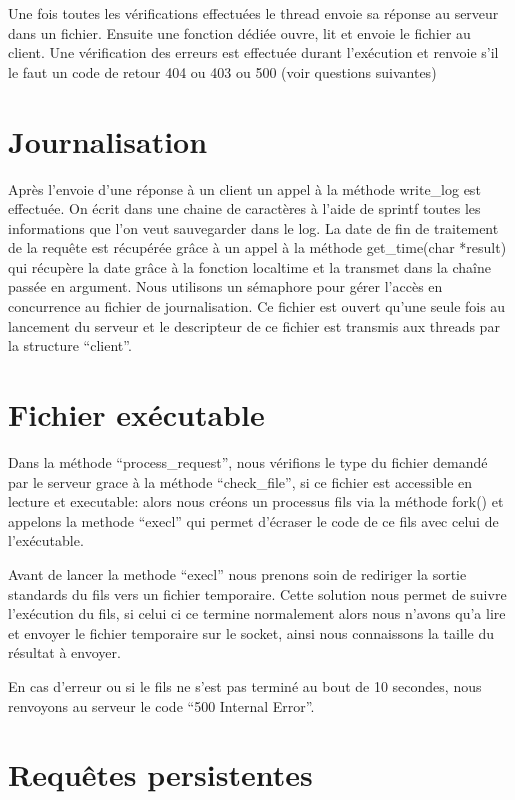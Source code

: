 \documentclass{article}
\begin{document}
Une fois toutes les vérifications effectuées le thread envoie sa réponse au serveur dans un fichier.
Ensuite une fonction dédiée ouvre, lit et envoie le fichier au client.
\hbox{}
Une vérification des erreurs est effectuée durant l'exécution et renvoie s'il le faut un code de retour 404 ou 403 ou 500 (voir questions suivantes)

\section{Journalisation}

Après l'envoie d'une réponse à un client un appel à la méthode write\_log est effectuée.
On écrit dans une chaine de caractères à l'aide de sprintf toutes les informations que l'on veut sauvegarder dans le log. La date de fin de traitement de la requête est récupérée grâce à un appel
à la méthode get\_time(char *result) qui récupère la date grâce à la fonction localtime et la transmet dans la chaîne passée en argument.\hbox{}
Nous utilisons un sémaphore pour gérer l'accès en concurrence au fichier de journalisation. Ce fichier est ouvert qu'une seule fois au lancement du serveur et le descripteur de ce fichier est transmis
aux threads par la structure ``client''.

\section{Fichier exécutable}

Dans la méthode ``process\_request'', nous vérifions le type du fichier demandé par le serveur grace à la méthode ``check\_file'', si ce fichier est accessible en lecture et executable: alors nous créons un processus fils via la méthode fork() et appelons la methode ``execl'' qui permet d'écraser le code de ce fils avec celui de l'exécutable. \hbox{}

Avant de lancer la methode ``execl'' nous prenons soin de rediriger la sortie standards du fils vers un fichier temporaire. Cette solution nous permet de suivre l'exécution du fils, si celui ci ce termine normalement alors nous n'avons qu'a lire et envoyer le fichier temporaire sur le socket, ainsi nous connaissons la taille du résultat à envoyer.

En cas d'erreur ou si le fils ne s'est pas terminé au bout de 10 secondes, nous renvoyons au serveur le code ``500 Internal Error''.

\section{Requêtes persistentes}
\end{document}
